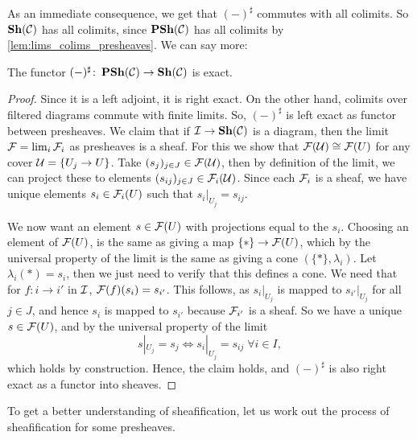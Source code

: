 \documentclass{article}
\begin{document}
As an immediate consequence, we get that $(-)^\sharp$
commutes with all colimits. So $\operatorname{\mathbf{Sh}}(\mathcal{C})$ has all colimits,
since $\operatorname{\mathbf{PSh}}(\mathcal{C})$ has all colimits by \cref{lem:lims_colims_presheaves}.
We can say more:
\begin{corollary}
    The functor $(-)^\sharp\colon \operatorname{\mathbf{PSh}}(\mathcal{C}) \to \operatorname{\mathbf{Sh}}(\mathcal{C})$ is exact.
\end{corollary}
\begin{proof}
    Since it is a left adjoint, it is right exact. On the other hand,
    colimits over filtered diagrams commute with finite limits.
    So, $(-)^\sharp$ is left exact as functor between presheaves.
    We claim that if $\mathcal{I} \to \operatorname{\mathbf{Sh}}(\mathcal{C})$ is a diagram, then
    the limit $\mathcal{F} = \lim_i \mathcal{F}_i$ as presheaves is a sheaf.
    For this we show that $\mathcal{F}(\mathcal{U}) \cong \mathcal{F}(U)$ for any cover $\mathcal{U} = \{U_j \to U\}$.
    Take $(s_j)_{j\in J} \in \mathcal{F}(\mathcal{U})$, then by definition of the
    limit, we can project these to elements $(s_{ij})_{j \in J} \in \mathcal{F}_i(\mathcal{U})$.
    Since each $\mathcal{F}_i$ is a sheaf, we have unique elements $s_i \in \mathcal{F}_i(U)$
    such that $s_i |_{U_j} = s_{ij}$.

    We now want an element $s\in \mathcal{F}(U)$ with projections equal to the $s_i$.
    Choosing an element of $\mathcal{F}(U)$, is the same as giving a map $\{*\} \to \mathcal{F}(U)$,
    which by the universal property of the limit is the same as giving a cone
    $(\{*\}, \lambda_i)$. Let $\lambda_i(*) = s_i$, then we just need to verify
    that this defines a cone.
    We need that for $f\colon i\to i'$ in $\mathcal{I}$,
    $\mathcal{F}(f)(s_i) = s_{i'}$. This follows, as $s_i|_{U_j}$ is mapped to $s_{i'}|_{U_j}$
    for all $j\in J$, and hence $s_i$ is mapped to $s_{i'}$ because
    $\mathcal{F}_{i'}$ is a sheaf. So we have a unique $s\in \mathcal{F}(U)$,
    and by the universal property of the limit
    \begin{equation*}
        s|_{U_j} = s_j \iff s_i|_{U_j} = s_{ij}\; \forall i\in I,
    \end{equation*}
    which holds by construction.
    Hence, the claim holds, and $(-)^\sharp$ is also right exact as a functor
    into sheaves.
\end{proof}
To get a better understanding of sheafification, let us work out
the process of sheafification for some presheaves.
\end{document}
